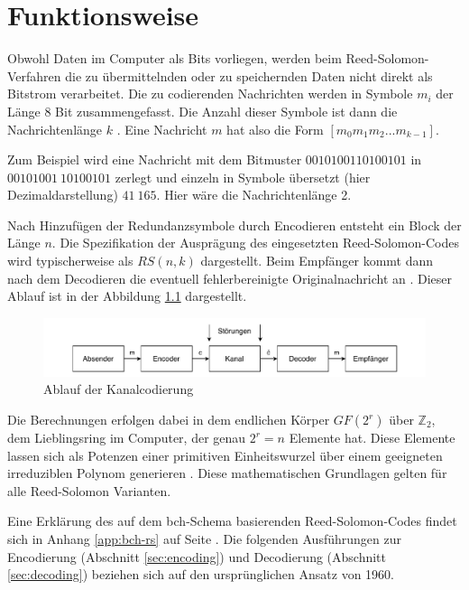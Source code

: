 \chapter{Funktionsweise}\label{ch:operatingPrinciple}

Obwohl Daten im Computer als Bits vorliegen, werden beim Reed-Solomon-Verfahren die zu übermittelnden oder zu speichernden Daten nicht direkt als Bitstrom verarbeitet.
Die zu codierenden Nachrichten werden in Symbole $m_{i}$ der Länge 8 Bit zusammengefasst.
Die Anzahl dieser Symbole ist dann die Nachrichtenlänge $k$ \cite{rileyReedSolomonCodes}.
Eine Nachricht $m$ hat also die Form $[m_{0}m_{1}m_{2}...m_{k-1}]$.

Zum Beispiel wird eine Nachricht mit dem Bitmuster $0010100110100101$ in $00101001\ 10100101$ zerlegt und einzeln in Symbole übersetzt (hier Dezimaldarstellung) $41\ 165$. Hier wäre die Nachrichtenlänge 2.

Nach Hinzufügen der Redundanzsymbole durch Encodieren entsteht ein Block der Länge $n$.
Die Spezifikation der Ausprägung des eingesetzten Reed-Solomon-Codes wird typischerweise als $RS(n, k)$ dargestellt.
Beim Empfänger kommt dann nach dem Decodieren die eventuell fehlerbereinigte Originalnachricht an \cite{hubertPracticalReedSolomonProgrammers2021}.
Dieser Ablauf ist in der Abbildung \ref{fig:channelcoding} dargestellt.
\begin{figure}[h]
	\centering
	\includegraphics[width=1\textwidth]{figures/Kanalcodierung.drawio.pdf}
	\caption{Ablauf der Kanalcodierung}
	\label{fig:channelcoding}
\end{figure}

Die Berechnungen erfolgen dabei in dem endlichen Körper $GF(2^r)$ über $\mathbb{Z}_2$, dem Lieblingsring im Computer, der genau $2^r=n$ Elemente hat.
Diese Elemente lassen sich als Potenzen einer primitiven Einheitswurzel über einem geeigneten irreduziblen Polynom generieren \cite{weitzKonkreteMathematikNicht2021}.
Diese mathematischen Grundlagen gelten für alle Reed-Solomon Varianten.
 
Eine Erklärung des auf dem \acrshort{bch}-Schema basierenden Reed-Solomon-Codes findet sich in Anhang \ref{app:bch-rs} auf Seite \pageref{app:bch-rs}.
Die folgenden Ausführungen zur Encodierung (Abschnitt \ref{sec:encoding}) und Decodierung (Abschnitt \ref{sec:decoding}) beziehen sich auf den ursprünglichen Ansatz von 1960.

